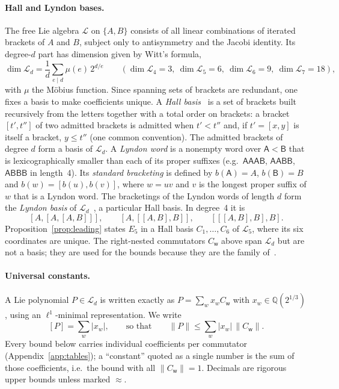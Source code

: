 \documentclass[11pt]{article}
\newcommand{\norm}[1]{\lVert #1\rVert}
\newcommand{\abs}[1]{\lvert #1\rvert}
\newcommand{\Qc}{\mathbb{Q}(2^{1/3})}
\newcommand{\Lie}{\mathcal{L}}
\newcommand{\C}[1]{C_{\mathsf{#1}}}
\newcommand{\lb}[1]{[#1]}
\theoremstyle{plain}
\theoremstyle{definition}
\theoremstyle{remark}
\begin{document}
\paragraph{Hall and Lyndon bases.} The free Lie algebra $\Lie$ on $\{A,B\}$ consists of all linear
combinations of iterated brackets of $A$ and $B$, subject only to antisymmetry and the Jacobi identity.
Its degree-$d$ part has dimension given by Witt's formula,
\[
\dim\Lie_d=\frac1d\sum_{e\mid d}\mu(e)\,2^{d/e}\qquad(\dim\Lie_4=3,\ \dim\Lie_5=6,\ \dim\Lie_6=9,\ \dim\Lie_7=18),
\]
with $\mu$ the M\"obius function. Since spanning sets of brackets are redundant, one fixes a basis to
make coefficients unique. A \emph{Hall basis}~\cite{Hall1950,Reutenauer1993} is a set of brackets
built recursively from the letters together with a total order on brackets: a bracket $[t',t'']$ of
two admitted brackets is admitted when $t'<t''$ and, if $t'=[x,y]$ is itself a bracket, $y\le t''$
(one common convention). The admitted brackets of degree $d$ form a basis of $\Lie_d$. A \emph{Lyndon word} is a nonempty word over $\mathsf A<\mathsf B$
that is lexicographically smaller than each of its proper suffixes (e.g.\ $\mathsf{AAAB}$, $\mathsf{AABB}$,
$\mathsf{ABBB}$ in length~4). Its \emph{standard bracketing} is defined by $b(\mathsf A)=A$, $b(\mathsf B)=B$
and $b(w)=[b(u),b(v)]$, where $w=uv$ and $v$ is the longest proper suffix of $w$ that is a Lyndon word.
The bracketings of the Lyndon words of length $d$ form the \emph{Lyndon basis} of
$\Lie_d$~\cite{Reutenauer1993}, a particular Hall basis. In degree~4 it is
\[
[A,[A,[A,B]]],\qquad [A,[[A,B],B]],\qquad [[[A,B],B],B].
\]
Proposition~\ref{prop:leading} states $E_5$ in a Hall basis $C_1,\dots,C_6$ of $\Lie_5$, where its six
coordinates are unique. The right-nested commutators $\C w$ above span $\Lie_d$ but are not a basis;
they are used for the bounds because they are the family of~\cite{Childs2021}.

\paragraph{Universal constants.} A Lie polynomial $P\in\Lie_d$ is written exactly as
$P=\sum_wx_w\C w$ with $x_w\in\Qc$, using an $\ell^1$-minimal representation. We write
\[
\lb P=\sum_w\abs{x_w},\qquad\text{so that}\qquad \norm P\le\sum_w\abs{x_w}\,\norm{\C w}.
\] Every bound below carries individual coefficients per
commutator (Appendix~\ref{app:tables}); a ``constant'' quoted as a single number is the sum of those
coefficients, i.e.\ the bound with all $\norm{\C w}=1$. Decimals are rigorous upper bounds unless
marked $\approx$.
\end{document}
